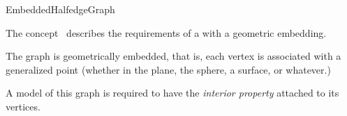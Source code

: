 
\begin{ccRefConcept}{EmbeddedHalfedgeGraph}


\ccDefinition

The concept \ccRefName\ describes the requirements of a 
with a geometric embedding.


The graph is geometrically embedded, that is, each vertex is associated with
 a generalized point (whether in the plane, the sphere, a surface, or whatever.)
 
\ccRefines
{}

A model of this graph is required to have the {\em interior property}  attached to its vertices.




\end{ccRefConcept}

